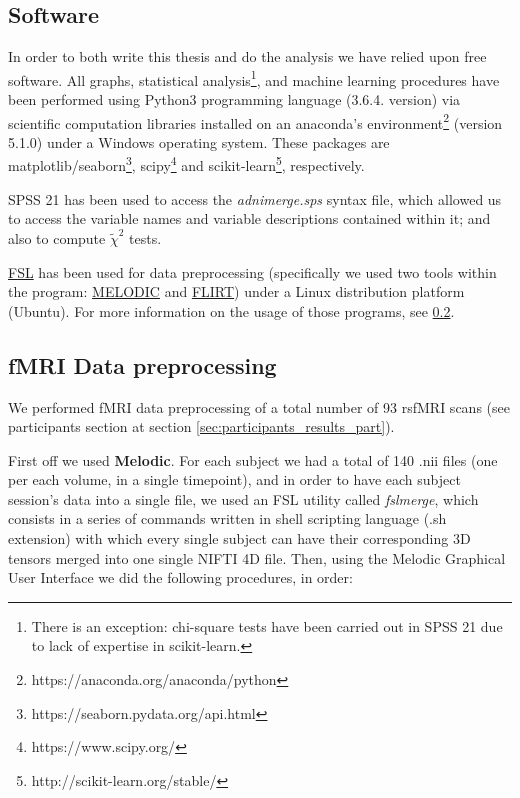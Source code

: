 \documentclass[a4paper,12pt]{elsarticle}  %
\begin{document}
\subsection{Software}

In order to both write this thesis and do the analysis we have relied upon free software. All graphs, statistical analysis\footnote{There is an exception: chi-square tests have been carried out in SPSS 21 due to lack of expertise in scikit-learn.}, and machine learning procedures have been performed using Python3 programming language (3.6.4. version) via scientific computation libraries installed on an anaconda's environment\footnote{https://anaconda.org/anaconda/python} (version 5.1.0) under a Windows operating system. These packages are matplotlib/seaborn\footnote{https://seaborn.pydata.org/api.html}, scipy\footnote{https://www.scipy.org/} and scikit-learn\footnote{http://scikit-learn.org/stable/}, respectively. 

SPSS 21 has been used to access the \textit{adnimerge.sps} syntax file, which allowed us to access the variable names and variable descriptions contained within it; and also to compute $\tilde{\chi}^2$ tests. 

\href{https://fsl.fmrib.ox.ac.uk/fsl/fslwiki}{FSL}\cite{oxford_fsl_web, Jenkinson2012782} has been used for data preprocessing (specifically we used two tools within the program: \href{https://fsl.fmrib.ox.ac.uk/fsl/fslwiki/MELODIC}{MELODIC}\cite{melodic_web} and \href{https://fsl.fmrib.ox.ac.uk/fsl/fslwiki/FLIRT}{FLIRT}\cite{flirt_web, Jenkinson2001143, Jenkinson2002825}) under a Linux distribution platform (Ubuntu). For more information on the usage of those programs, see \ref{fmri_preproc}.

\subsection{fMRI Data preprocessing}	\label{fmri_preproc}

We performed fMRI data preprocessing of a total number of 93 rsfMRI scans (see participants section at section \ref{sec:participants_results_part}). 

First off we used \textbf{Melodic}. For each subject we had a total of 140 .nii files (one per each volume, in a single timepoint), and in order to have each subject session's data into a single file, we used an FSL utility called \textit{fslmerge}\cite{melodic_web}, which consists in a series of commands written in shell scripting language (.sh extension) with which every single subject can have their corresponding 3D tensors merged into one single NIFTI 4D file. Then, using the Melodic Graphical User Interface we did the following procedures, in order:
\end{document}
